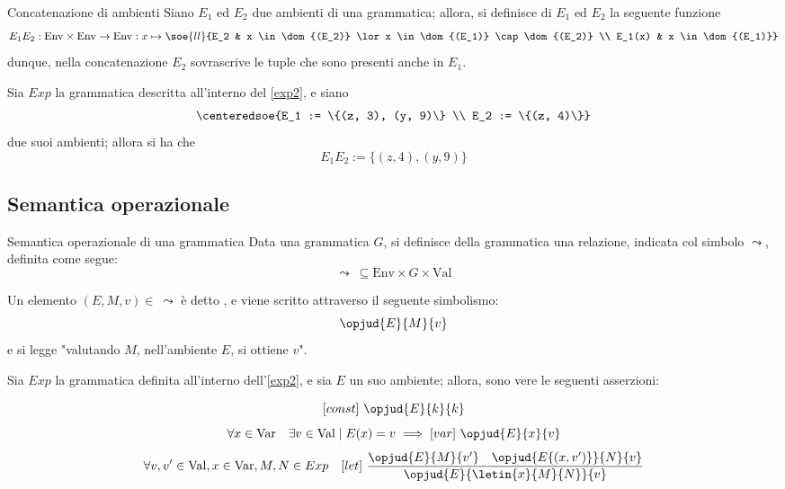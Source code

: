 \documentclass[a4paper, 12pt]{report}
\begin{document}
    \begin{frameddefn}{Concatenazione di ambienti}
        Siano $E_1$ ed $E_2$ due ambienti di una grammatica; allora, si definisce  di $E_1$ ed $E_2$ la seguente funzione $$E_1E_2: \mathrm{Env} \times \mathrm{Env} \to \mathrm{Env} : x \mapsto \soe{ll}{E_2 & x \in \dom{(E_2)} \lor x \in \dom{(E_1)} \cap \dom{(E_2)} \\ E_1(x) & x \in \dom{(E_1)}}$$ dunque, nella concatenazione $E_2$ sovrascrive le tuple che sono presenti anche in $E_1$.
    \end{frameddefn}

    \begin{example}
        Sia $Exp$ la grammatica descritta all'interno del \cref{exp2}, e siano $$\centeredsoe{E_1 := \{(z, 3), (y, 9)\} \\ E_2 := \{(z, 4)\}}$$ due suoi ambienti; allora si ha che $$E_1E_2 := \{(z, 4), (y, 9)\}$$
    \end{example}

    \subsection{Semantica operazionale}

    \begin{frameddefn}[label={sem opexp}]{Semantica operazionale di una grammatica}
        Data una grammatica $G$, si definisce  della grammatica una relazione, indicata col simbolo $\leadsto$, definita come segue: $$\leadsto \ \subseteq \mathrm{Env} \times G \times \mathrm{Val}$$

        Un elemento $(E, M, v) \in \ \leadsto$ è detto , e viene scritto attraverso il seguente simbolismo: $$\opjud{E}{M}{v}$$ e si legge "valutando $M$, nell'ambiente $E$, si ottiene $v$".
    \end{frameddefn}

    \begin{example}
        \label{exp2 clauses}
        Sia $Exp$ la grammatica definita all'interno dell'\cref{exp2}, e sia $E$ un suo ambiente; allora, sono vere le seguenti asserzioni:
        
        $$[const] \ \opjud{E}{k}{k}$$
        $$\forall x \in \mathrm{Var} \quad \exists v \in \mathrm{Val} \mid E(x) = v \implies [var] \ \opjud{E}{x}{v}$$
        $$\forall v, v' \in \mathrm{Val}, x \in \mathrm{Var}, M, N \in Exp \quad [let] \ \dfrac{\opjud{E}{M}{v'} \quad \opjud{E\{(x, v')\}}{N}{v}}{\opjud{E}{\letin{x}{M}{N}}{v}}$$
    \end{example}
\end{document}
